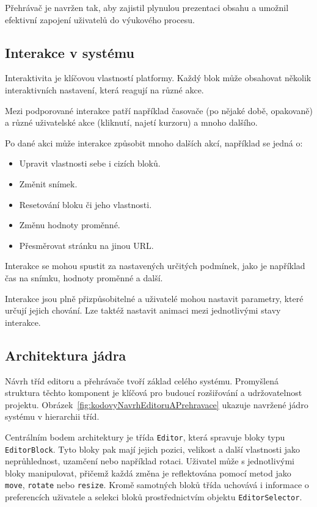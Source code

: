 Přehrávač je navržen tak, aby zajistil plynulou prezentaci obsahu a umožnil efektivní zapojení uživatelů do výukového procesu.

\subsection{Interakce v systému}

Interaktivita je klíčovou vlastností platformy.
Každý blok může obsahovat několik interaktivních nastavení, která reagují na různé akce. 

Mezi podporované interakce patří například časovače (po nějaké době, opakovaně) a různé uživatelské akce (kliknutí, najetí kurzoru) a mnoho dalšího. 

Po dané akci může interakce způsobit mnoho dalších akcí, například se jedná o:

\begin{itemize}
    \item Upravit vlastnosti sebe i cizích bloků.
    \item Změnit snímek.
    \item Resetování bloku či jeho vlastnosti.
    \item Změnu hodnoty proměnné. 
    \item Přesměrovat stránku na jinou URL.
\end{itemize}

Interakce se mohou spustit za nastavených určitých podmínek, jako je například čas na snímku, hodnoty proměnné a další.

Interakce jsou plně přizpůsobitelné a uživatelé mohou nastavit parametry, které určují jejich chování.
Lze taktéž nastavit animaci mezi jednotlivými stavy interakce.

\subsection{Architektura jádra}

Návrh tříd editoru a přehrávače tvoří základ celého systému. 
Promyšlená struktura těchto komponent je klíčová pro budoucí rozšiřování a udržovatelnost projektu.
Obrázek~\ref{fig:kodovyNavrhEditoruAPrehravace} ukazuje navržené jádro systému v hierarchii tříd.

Centrálním bodem architektury je třída \texttt{Editor}, která spravuje bloky typu \texttt{EditorBlock}. 
Tyto bloky pak mají jejich pozici, velikost a další vlastnosti jako neprůhlednost, uzamčení nebo například rotaci. 
Uživatel může s jednotlivými bloky manipulovat, přičemž každá změna je reflektována pomocí metod jako \texttt{move}, \texttt{rotate} nebo \texttt{resize}.
Kromě samotných bloků třída uchovává i informace o preferencích uživatele a selekci bloků prostřednictvím objektu \texttt{EditorSelector}.

